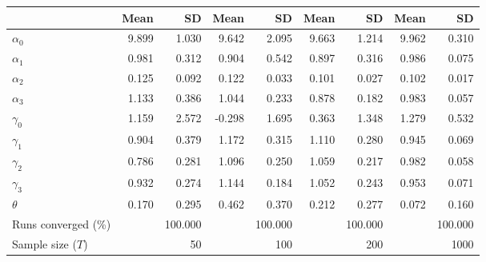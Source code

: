 
\begin{tabular}[t]{lrrrrrrrr}
\toprule
  & Mean & SD & Mean  & SD  & Mean   & SD   & Mean    & SD   \\
\midrule
$\alpha_{0}$ & 9.899 & 1.030 & 9.642 & 2.095 & 9.663 & 1.214 & 9.962 & 0.310\\
$\alpha_{1}$ & 0.981 & 0.312 & 0.904 & 0.542 & 0.897 & 0.316 & 0.986 & 0.075\\
$\alpha_{2}$ & 0.125 & 0.092 & 0.122 & 0.033 & 0.101 & 0.027 & 0.102 & 0.017\\
$\alpha_{3}$ & 1.133 & 0.386 & 1.044 & 0.233 & 0.878 & 0.182 & 0.983 & 0.057\\
$\gamma_{0}$ & 1.159 & 2.572 & -0.298 & 1.695 & 0.363 & 1.348 & 1.279 & 0.532\\
$\gamma_{1}$ & 0.904 & 0.379 & 1.172 & 0.315 & 1.110 & 0.280 & 0.945 & 0.069\\
$\gamma_{2}$ & 0.786 & 0.281 & 1.096 & 0.250 & 1.059 & 0.217 & 0.982 & 0.058\\
$\gamma_{3}$ & 0.932 & 0.274 & 1.144 & 0.184 & 1.052 & 0.243 & 0.953 & 0.071\\
$\theta$ & 0.170 & 0.295 & 0.462 & 0.370 & 0.212 & 0.277 & 0.072 & 0.160\\
Runs converged (\%) &  & 100.000 &  & 100.000 &  & 100.000 &  & 100.000\\
Sample size ($T$) &  & 50 &  & 100 &  & 200 &  & 1000\\
\bottomrule
\end{tabular}

